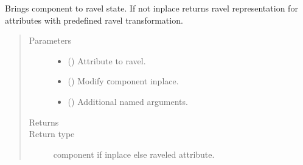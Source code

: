 \documentclass[letterpaper,10pt,english]{sphinxmanual}
\begin{document}
\begin{fulllineitems}
\begin{fulllineitems}
\label{\detokenize{api/base_classes:geology.src.base_spatial.SpatialComponent.ravel}}
Brings component to ravel state. If not inplace returns
ravel representation for attributes with pre\sphinxhyphen{}defined ravel transformation.
\begin{quote}\begin{description}
\item[{Parameters}] \leavevmode\begin{itemize}
\item {} 
 (\sphinxstyleliteralemphasis{\sphinxupquote{, }}) \textendash{} Attribute to ravel.

\item {} 
 () \textendash{} Modify сomponent inplace.

\item {} 
 () \textendash{} Additional named arguments.

\end{itemize}

\item[{Returns}] \leavevmode
{}

\item[{Return type}] \leavevmode
component if inplace else raveled attribute.

\end{description}\end{quote}

\end{fulllineitems}



\end{fulllineitems}
\end{document}
